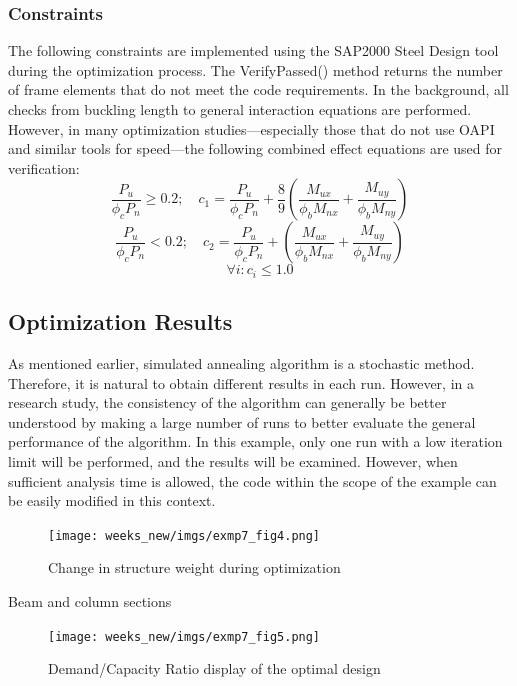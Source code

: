 \subsubsection{Constraints}
The following constraints are implemented using the SAP2000 Steel Design tool during the optimization process. The VerifyPassed() method returns the number of frame elements that do not meet the code requirements. In the background, all checks from buckling length to general interaction equations are performed. However, in many optimization studies—especially those that do not use OAPI and similar tools for speed—the following combined effect equations are used for verification:
\begin{equation}
    \frac{P_u}{\phi_c P_n} \geq 0.2; \quad c_1=\frac{P_u}{\phi_c P_n} + \frac{8}{9} \left(\frac{M_{ux}}{\phi_b M_{nx}} + \frac{M_{uy}}{\phi_b M_{ny}}\right) 
\end{equation}
\begin{equation}
    \frac{P_u}{\phi_c P_n} < 0.2; \quad c_2=\frac{P_u}{\phi_c P_n} +  \left(\frac{M_{ux}}{\phi_b M_{nx}} + \frac{M_{uy}}{\phi_b M_{ny}}\right) 
\end{equation}
\begin{equation}
    \forall i: c_i \leq 1.0
\end{equation}

\subsection{Optimization Results}
As mentioned earlier, simulated annealing algorithm is a stochastic method. Therefore, it is natural to obtain different results in each run. However, in a research study, the consistency of the algorithm can generally be better understood by making a large number of runs to better evaluate the general performance of the algorithm. In this example, only one run with a low iteration limit will be performed, and the results will be examined. However, when sufficient analysis time is allowed, the code within the scope of the example can be easily modified in this context.

\begin{figure}[H]
    \centering
    \texttt{[image: weeks\_new/imgs/exmp7\_fig4.png]}
    \caption{Change in structure weight during optimization}
    \label{fig:weight_change}
\end{figure}

\begin{table}
    \caption{Beam and column sections}
\end{table}

\begin{figure}[H]
    \centering
    \texttt{[image: weeks\_new/imgs/exmp7\_fig5.png]}
    \caption{Demand/Capacity Ratio display of the optimal design}
    \label{fig:dcr_values}
\end{figure} 